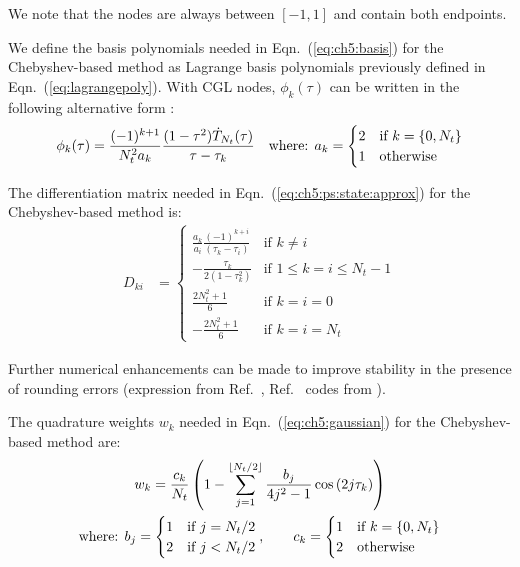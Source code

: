 \noindent We note that the nodes are always between $[-1,1]$ and contain both endpoints.

We define the basis polynomials needed in Eqn.~(\ref{eq:ch5:basis}) for the Chebyshev-based method as Lagrange basis polynomials previously defined in Eqn.~(\ref{eq:lagrangepoly}). With CGL nodes, $\phi_k(\tau)$ can be written in the following alternative form \cite{Fahroo2002a}:
\begin{align}
\phi_k(\tau) = \frac{(-1)^{k+1}}{N_t^2 a_k} \frac{(1-\tau^2)\ensuremath{\protect\dot{T}}_{N_t}(\tau)}{\tau - \tau_k} \quad \text{where: } a_k = \begin{cases} 2 & \text{if } k = \{0,N_t\} \\ 1& \text{otherwise}\end{cases}
\end{align}

The differentiation matrix needed in Eqn.~(\ref{eq:ch5:ps:state:approx}) for the Chebyshev-based method is:
\begin{align}
D_{ki} &= \begin{cases}
\frac{a_k}{a_i} \frac{(-1)^{k+i}}{(\tau_k-\tau_i)} & \text{if } k \neq i \\
-\frac{\tau_k}{2(1-\tau_k^2)} & \text{if } 1 \leq k = i \leq {N_t} - 1 \\
\frac{2N_t^2 + 1}{6} & \text{if } k = i = 0 \\
-\frac{2N_t^2 + 1}{6} & \text{if } k = i = {N_t}
\end{cases}
\end{align}

\noindent Further numerical enhancements can be made to improve stability in the presence of rounding errors (expression from Ref.~\cite{Fahroo2002a}, Ref.~\cite{github-basic-multiple-interval-pseudospectral} codes from \cite[p.~54]{Trefethen2000a}).

The quadrature weights ${w}_k$ needed in Eqn.~(\ref{eq:ch5:gaussian}) for the Chebyshev-based method are:
\begin{gather}
{w}_k =  \frac{c_k}{N_t}\left(1 - \sum_{j=1}^{\lfloor N_t/2\rfloor} \frac{b_j}{4j^2 - 1} \cos\left(2j\tau_k \right) \right) \\
 \text{where: } {b_j} = \begin{cases} 1 & \text{if } j = N_t/2 \\ 2& \text{if } j < N_t/2 \end{cases},  \qquad {c}_k = \begin{cases} 1 & \text{if } k = \{0,N_t\}  \\ 2& \text{otherwise} \end{cases} \notag
\end{gather}

